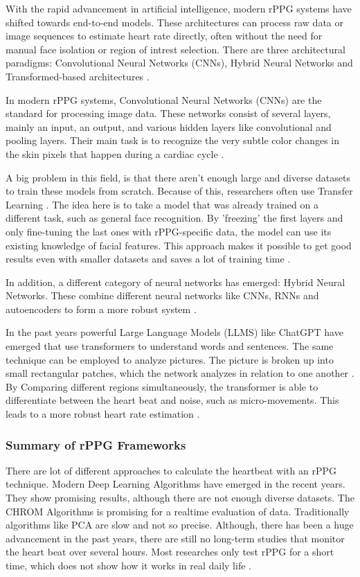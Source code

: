 With the rapid advancement in artificial intelligence, modern rPPG systems have shifted towards end-to-end models. These architectures can process raw data or image sequences to estimate heart rate directly, often without the need for manual face isolation or region of intrest  selection. There are three architectural paradigms: Convolutional Neural Networks (CNNs), Hybrid Neural Networks and Transformed-based architectures \cite{Debnath25}.

In modern rPPG systems, Convolutional Neural Networks (CNNs) are the standard for processing image data. These networks consist of several layers, mainly an input, an output, and various hidden layers like convolutional and pooling layers. Their main task is to recognize the very subtle color changes in the skin pixels that happen during a cardiac cycle \cite{Debnath25}.

A big problem in this field, is that there aren't enough large and diverse datasets to train these models from scratch. Because of this, researchers often use Transfer Learning \cite{Debnath25}. The idea here is to take a model that was already trained on a different task, such as general face recognition. By 'freezing' the first layers and only fine-tuning the last ones with rPPG-specific data, the model can use its existing knowledge of facial features. This approach makes it possible to get good results even with smaller datasets and saves a lot of training time \cite{pan2009survey}.

In addition, a different category of neural networks has emerged: Hybrid Neural Networks. These combine different neural networks like CNNs, RNNs and autoencoders to form a more robust system \cite{Debnath25}.

In the past years powerful Large Language Models (LLMS) like ChatGPT have emerged that use transformers to understand words and sentences. The same technique can be employed to analyze pictures. The picture is broken up into small rectangular patches, which the network analyzes in relation to one another \cite{dosovitskiy2021an}. By Comparing different regions simultaneously, the transformer is able to differentiate between the heart beat and noise, such as micro-movements. This leads to a more robust heart rate estimation \cite{Debnath25}.


\subsubsection{Summary of rPPG Frameworks}
There are lot of different approaches to calculate the heartbeat with an rPPG technique.
Modern Deep Learning Algorithms have emerged in the recent years. They show promising results, although there are not enough diverse datasets. The CHROM Algorithms is promising for a realtime evaluation of data. Traditionally algorithms like PCA are slow and not so precise.
Although, there has been a huge advancement in the past years, there are still no long-term studies that monitor the heart beat over several hours. Most researches only test rPPG for a short time, which does not show how it works in real daily life \cite{Debnath25}.


